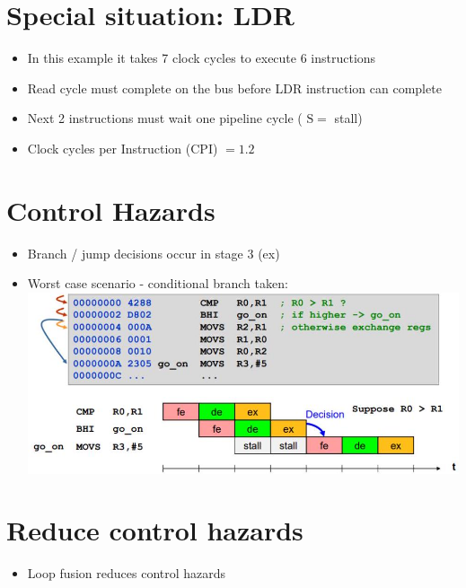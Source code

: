 \documentclass[10pt]{article}
\begin{document}
\section*{Special situation: LDR}
\begin{itemize}
  \item In this example it takes 7 clock cycles to execute 6 instructions
  \item Read cycle must complete on the bus before LDR instruction can complete
  \item Next 2 instructions must wait one pipeline cycle ( $\mathrm{S}=$ stall)
  \item Clock cycles per Instruction (CPI) $=1.2$
\end{itemize}

\section*{Control Hazards}
\begin{itemize}
  \item Branch / jump decisions occur in stage 3 (ex)
  \item Worst case scenario - conditional branch taken:\\
\includegraphics[max width=\textwidth, center]{2024_12_29_79e6b22f503fb7b4f718g-15}
\end{itemize}

\section*{Reduce control hazards}
\begin{itemize}
  \item Loop fusion reduces control hazards
\end{itemize}
\end{document}
